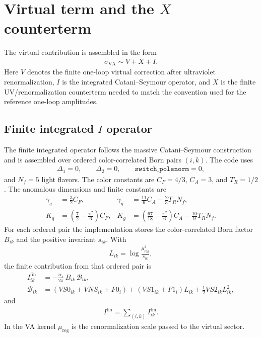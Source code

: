 \documentclass[11pt]{article}
\begin{document}
\section{Virtual term and the \texorpdfstring{$X$}{X} counterterm}

The virtual contribution is assembled in the form
\begin{align}
\sigma_{\text{VA}} \sim V + X + I.
\end{align}
Here $V$ denotes the finite one-loop virtual correction after ultraviolet renormalization,
$I$ is the integrated Catani--Seymour operator,
and $X$ is the finite UV/renormalization counterterm needed to match the convention used for the reference one-loop amplitudes.

\subsection{Finite integrated \texorpdfstring{$I$}{I} operator}

The finite integrated operator follows the massive Catani--Seymour construction~\cite{Catani:1996vz} and is assembled over ordered color-correlated Born pairs $(i,k)$.
The code uses
\begin{align}
\Delta_1=0,
\qquad
\Delta_2=0,
\qquad
\texttt{switch\_polenorm}=0,
\end{align}
and $N_f=5$ light flavors. The color constants are $C_F=4/3$, $C_A=3$, and $T_R=1/2$. The anomalous dimensions and finite constants are
\begin{align}
\gamma_q &= \frac{3}{2}C_F,
&\gamma_g &= \frac{11}{6}C_A-\frac{2}{3}T_RN_f,\\
K_q &= \left(\frac{7}{2}-\frac{\pi^2}{6}\right)C_F,
&K_g &= \left(\frac{67}{18}-\frac{\pi^2}{6}\right)C_A-\frac{10}{9}T_RN_f.
\end{align}
For each ordered pair the implementation stores the color-correlated Born factor $B_{ik}$ and the positive invariant $s_{ik}$. With
\begin{align}
L_{ik}=\log\frac{\mu_{\text{reg}}^2}{s_{ik}},
\end{align}
the finite contribution from that ordered pair is
\begin{align}
I_{ik}^{\text{fin}} &=-\frac{\alpha_s}{2\pi}\,B_{ik}\,\mathcal{B}_{ik},\\
\mathcal{B}_{ik}
&=\left(VS0_{ik}+VNS_{ik}+F0_i\right)
 +\left(VS1_{ik}+F1_i\right)L_{ik}
 +\frac{1}{2}VS2_{ik}L_{ik}^2,
\end{align}
and
\begin{align}
I^{\text{fin}}=\sum_{(i,k)} I_{ik}^{\text{fin}}.
\end{align}
In the VA kernel $\mu_{\text{reg}}$ is the renormalization scale passed to the virtual sector.
\end{document}
